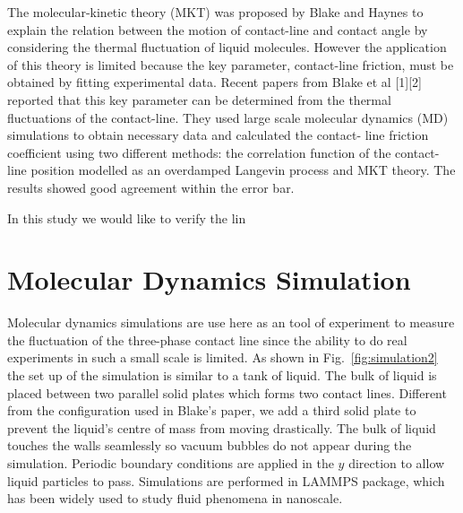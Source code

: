 \documentclass[
reprint,
 amsmath,amssymb,
 aps,
url
]{revtex4-1}
\begin{document}
The molecular-kinetic theory (MKT) was proposed by Blake and Haynes to explain the relation
between the motion of contact-line and contact angle by considering the thermal fluctuation of liquid
molecules. However the application of this theory is limited because the key parameter, contact-line
friction, must be obtained by fitting experimental data. Recent papers from Blake et al [1][2] reported
that this key parameter can be determined from the thermal fluctuations of the contact-line. They used
large scale molecular dynamics (MD) simulations to obtain necessary data and calculated the contact-
line friction coefficient using two different methods: the correlation function of the contact-line
position modelled as an overdamped Langevin process and MKT theory. The results showed good
agreement within the error bar.

In this study we would like to verify the lin



\section{Molecular Dynamics Simulation}

Molecular dynamics simulations are use here as an tool of experiment to measure the fluctuation of the three-phase contact line since the ability to do real experiments in such a small scale is limited. As shown in Fig.~\ref{fig:simulation2} the set up of the simulation is similar to a tank of liquid. The bulk of liquid is placed between two parallel solid plates which forms two contact lines. Different from the configuration used in Blake's paper\cite{fernandez-toledano_contact-line_2019}, we add a third solid plate to prevent the liquid's centre of mass from moving drastically. The bulk of liquid touches the walls seamlessly so vacuum bubbles do not appear during the simulation. Periodic boundary conditions are applied in the $y$ direction to allow liquid particles to pass.  Simulations are performed in LAMMPS package\cite{plimpton_fast_1995}, which has been widely used to study fluid phenomena in nanoscale\cite{blake_forced_2015,zhang_molecular_2019,zhao_revisiting_2019}.
\end{document}

